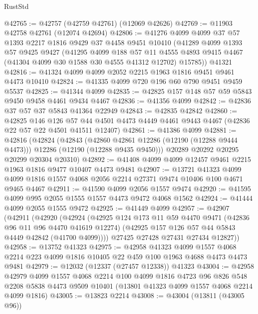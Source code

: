 \begin{lexlean}{RustStd}
\begin{coremodule}
@42765 := @42757 (@42759 @42761) (@12069 @42626)
@42769 := @11903 @42758 @42761 (@12074 @42694)
@42806 := @41276
    @4099
    @4099
    @37
    @57
    @1393
    @2217
    @1816
    @9429
    @37
    @4458
    @9451
    @10410
    (@41289
      @4099
      @1393
      @57
      @9425
      @9427
      (@41295
        @4099
        @188
        @57
        @11
        @4555
        @4893
        @9415
        @4467
        (@41304 @4099 @30 @1588 @30 @4555 @41312 @12702)
        @15785))
    @41321
@42816 := @41324 @4099 @4099 @2052 @2215 @1963 @1816 @9451 @9461 @4473 @10410
@42824 := @41335 @4099 @720 @196 @60 @790 @9451 @9459 @5537
@42825 := @41344 @4099
@42835 := @42825 @157 @148 @57 @59 @5843 @9450 @9458 @4461 @9434 @4467
@42836 := @41356 @4099
@42842 := @42836 @37 @57 @37 @5843 @41364 @22949
@42843 := @42835 @42842
@42860 := @42825
    @146
    @126
    @57
    @44
    @4501
    @4473
    @4449
    @4461
    @9443
    @4467
    (@42836 @22 @57 @22 @4501 @41511 @12407)
@42861 := @41386 @4099
@42881 := @42816
    (@42824
      (@42843
        (@42860 @42861 @12286 (@12190 (@12288 @9444 @4473)))
        @12286
        (@12190 (@12288 @9435 @9450)))
      @20289
      @20292
      @20295
      @20299
      @20304
      @20310)
@42892 := @41408 @4099 @4099 @12457 @9461 @2215 @1963 @1816 @9477 @10407 @4473 @9481
@42907 := @13721
    @41323
    @4099
    @4099
    @1816
    @1557
    @4068
    @2056
    @2214
    @27371
    @9474
    @10406
    @100
    @4671
    @9465
    @4467
@42911 := @41590 @4099 @2056 @1557 @9474
@42920 := @41595 @4099 @995 @2055 @1555 @1557 @4473 @9472 @4068 @1562
@42924 := @41444 @4099 @2055 @1555 @9472
@42925 := @41449 @4099
@42957 := @42907
    (@42911
      (@42920
        (@42924
          (@42925
            @124
            @173
            @11
            @59
            @4470
            @9471
            (@42836 @96 @11 @96 @4470 @41619 @12274)
            (@42925 @157 @126 @57 @44 @5843 @4449 @42842 (@41700 @4099))))
        @27425
        @27428
        @27431
        @27434
        @12827))
@42958 := @13752 @41323
@42975 := @42958
    @41323
    @4099
    @1557
    @4068
    @2214
    @223
    @4099
    @1816
    @10405
    @22
    @459
    @100
    @1963
    @4688
    @4473
    @4473
    @9481
@42979 := @12032 (@12337 (@27457 @12338)) @41323
@43004 := @42958
    @42979
    @4099
    @1557
    @4068
    @2214
    @100
    @4099
    @1816
    @4723
    @96
    @826
    @548
    @2208
    @5838
    @4473
    @9509
    @10401
    (@13801 @41323 @4099 @1557 @4068 @2214 @4099 @1816)
@43005 := @13823 @2214
@43008 := @43004 (@13811 (@43005 @96))

\end{coremodule}
\end{lexlean}
